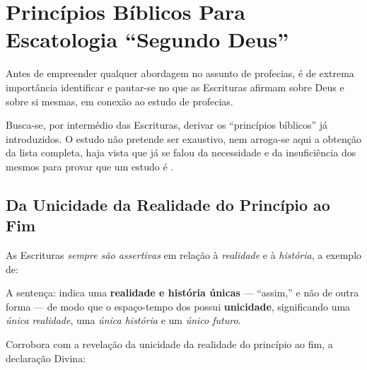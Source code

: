 \section{Princípios Bíblicos Para Escatologia ``Segundo Deus''}

    Antes de empreender qualquer abordagem no assunto de profecias, é de extrema importância identificar e pautar-se no  que  as
    Escrituras afirmam sobre Deus e sobre si mesmas, em conexão ao estudo de profecias.

    Busca-se, por intermédio das Escrituras, derivar os ``princípios bíblicos'' já  introduzidos.  O  estudo  não  pretende  ser
    exaustivo, nem arroga-se aqui a obtenção da lista completa, haja vista que já se falou da necessidade e da insuficiência dos
    mesmos para provar que um estudo é .


    \subsection{Da Unicidade da Realidade do Princípio ao Fim}

    As Escrituras \emph{sempre são assertivas} em relação à \emph{realidade} e à \emph{história}, a exemplo de:


    A sentença:  indica uma \textbf{realidade e história únicas} --- ``assim,'' e não de outra forma --- de
    modo que o espaço-tempo dos  possui \textbf{unicidade}, significando uma  \emph{única  realidade},  uma
    \emph{única história} e um \emph{único futuro}.

    Corrobora com a revelação da unicidade da realidade do princípio ao fim, a declaração Divina:
        

